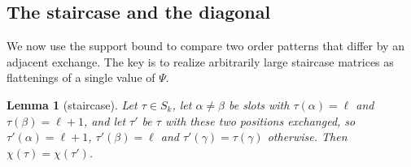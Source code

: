 \documentclass[11pt]{amsart}
\newtheorem{lemma}[theorem]{Lemma}
\theoremstyle{definition}
\theoremstyle{remark}
\numberwithin{equation}{section}
\theoremstyle{plain}
\theoremstyle{definition}
\theoremstyle{plain}
\begin{document}
\subsection{The staircase and the diagonal}

We now use the support bound to compare two order patterns that differ by an adjacent exchange. The key is to
realize arbitrarily large staircase matrices as flattenings of a single value of $\Psi$.

\begin{lemma}[staircase]\label{lem:S}
Let $\tau\in S_k$, let $\alpha\neq\beta$ be slots with $\tau(\alpha)=\ell$ and $\tau(\beta)=\ell+1$, and let $\tau'$ be $\tau$
with these two positions exchanged, so $\tau'(\alpha)=\ell+1$, $\tau'(\beta)=\ell$ and $\tau'(\gamma)=\tau(\gamma)$ otherwise.
Then $\chi(\tau)=\chi(\tau')$.
\end{lemma}
\end{document}
